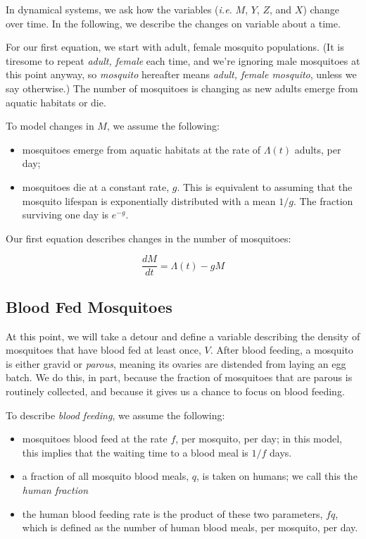 \documentclass[
]{book}
\begin{document}
In dynamical systems, we ask how the variables (\emph{i.e.} \(M\), \(Y\), \(Z\), and \(X\)) change over time. In the following, we describe the changes on variable about a time.

For our first equation, we start with adult, female mosquito populations. (It is tiresome to repeat \emph{adult, female} each time, and we're ignoring male mosquitoes at this point anyway, so \emph{mosquito} hereafter means \emph{adult, female mosquito}, unless we say otherwise.) The number of mosquitoes is changing as new adults emerge from aquatic habitats or die.

To model changes in \(M\), we assume the following:

\begin{itemize}
\item
  mosquitoes emerge from aquatic habitats at the rate of \(\Lambda(t)\) adults, per day;
\item
  mosquitoes die at a constant rate, \(g\). This is equivalent to assuming that the mosquito lifespan is exponentially distributed with a mean \(1/g\). The fraction surviving one day is \(e^{-g}\).
\end{itemize}

Our first equation describes changes in the number of mosquitoes:

\begin{equation}
\frac{dM}{dt} = \Lambda(t) - g M
\end{equation}

\subsection{Blood Fed Mosquitoes}\label{blood-fed-mosquitoes}

At this point, we will take a detour and define a variable describing the density of mosquitoes that have blood fed at least once, \(V\). After blood feeding, a mosquito is either gravid or \emph{parous}, meaning its ovaries are distended from laying an egg batch. We do this, in part, because the fraction of mosquitoes that are parous is routinely collected, and because it gives us a chance to focus on blood feeding.

To describe \emph{blood feeding}, we assume the following:

\begin{itemize}
\item
  mosquitoes blood feed at the rate \(f\), per mosquito, per day; in this model, this implies that the waiting time to a blood meal is \(1/f\) days.
\item
  a fraction of all mosquito blood meals, \(q\), is taken on humans; we call this the \emph{human fraction}
\item
  the human blood feeding rate is the product of these two parameters, \(fq\), which is defined as the number of human blood meals, per mosquito, per day.
\end{itemize}
\end{document}
